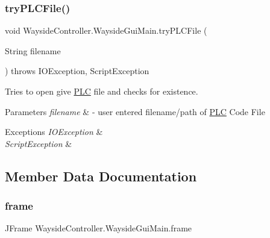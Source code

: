 \mbox{\label{classWaysideController_1_1WaysideGuiMain_a5f4353da24b4d0f25ba614c69f8d37bd}} 
\subsubsection{\texorpdfstring{try\+P\+L\+C\+File()}{tryPLCFile()}}
{\footnotesize\ttfamily void Wayside\+Controller.\+Wayside\+Gui\+Main.\+try\+P\+L\+C\+File (\begin{DoxyParamCaption}\item[{String}]{filename }\end{DoxyParamCaption}) throws I\+O\+Exception, Script\+Exception}



Tries to open give \hyperlink{classWaysideController_1_1PLC}{P\+LC} file and checks for existence. 


\begin{DoxyParams}{Parameters}
{\em filename} & -\/ user entered filename/path of \hyperlink{classWaysideController_1_1PLC}{P\+LC} Code File \\
\hline
\end{DoxyParams}

\begin{DoxyExceptions}{Exceptions}
{\em I\+O\+Exception} & \\
\hline
{\em Script\+Exception} & \\
\hline
\end{DoxyExceptions}


\subsection{Member Data Documentation}
\mbox{\label{classWaysideController_1_1WaysideGuiMain_a7bb363eb04328d1213e193d5710462c9}} 
\subsubsection{\texorpdfstring{frame}{frame}}
{\footnotesize\ttfamily J\+Frame Wayside\+Controller.\+Wayside\+Gui\+Main.\+frame\hspace{0.3cm}{\ttfamily [private]}}

